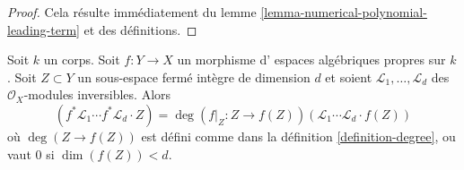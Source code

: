\begin{proof}
Cela résulte immédiatement du lemme \ref{lemma-numerical-polynomial-leading-term}
et des définitions.
\end{proof}

\begin{lemma}
\label{lemma-intersection-number-and-pullback}
Soit $k$ un corps. Soit $f : Y \to X$ un morphisme d'
espaces algébriques propres sur $k$.
Soit $Z \subset Y$ un sous-espace fermé intègre de dimension $d$ et soient
$\mathcal{L}_1, \ldots, \mathcal{L}_d$ des $\mathcal{O}_X$-modules inversibles.
Alors
$$
(f^*\mathcal{L}_1 \cdots f^*\mathcal{L}_d \cdot Z) =
\deg(f|_Z : Z \to f(Z)) (\mathcal{L}_1 \cdots \mathcal{L}_d \cdot f(Z))
$$
où $\deg(Z \to f(Z))$ est défini comme dans la définition \ref{definition-degree},
ou vaut $0$ si $\dim(f(Z)) < d$.
\end{lemma}

